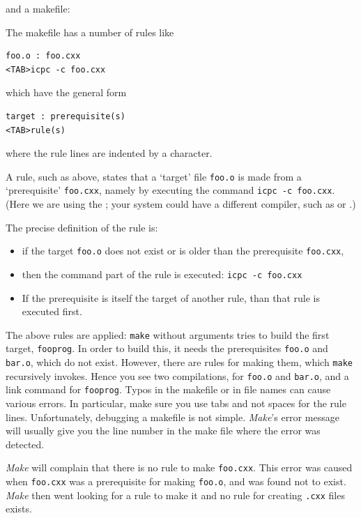 and a makefile:

The makefile has a number of rules like
\begin{lstlisting}
foo.o : foo.cxx
<TAB>icpc -c foo.cxx
\end{lstlisting}
which have the general form
\begin{lstlisting}
target : prerequisite(s)
<TAB>rule(s)
\end{lstlisting}
where the rule lines are indented by a  character.

A rule, such as above, states that a `target' file \lstinline{foo.o} is made
from a `prerequisite' \lstinline{foo.cxx},
namely by executing the command \lstinline{icpc -c foo.cxx}.
(Here we are using the  ;
your system could have a different compiler,
such as  or .)

The precise definition of the rule is:
\begin{itemize}
\item if the target \lstinline{foo.o} does not exist or is older than the
  prerequisite \lstinline{foo.cxx},
\item then the command part of the rule is executed: \lstinline{icpc -c foo.cxx}
\item If the prerequisite is itself the target of another rule, than that
  rule is executed first.
\end{itemize}

  {The above rules are applied: \lstinline{make} without arguments tries to
    build the first target, \lstinline{fooprog}. In order to build this, it
    needs the prerequisites \lstinline{foo.o} and \lstinline{bar.o}, which do not
    exist. However, there are rules for making them, which \lstinline{make}
    recursively invokes. Hence you see two compilations, for \lstinline{foo.o}
    and \lstinline{bar.o}, and a link command for \lstinline{fooprog}.}
  {Typos in the makefile or in file names can cause various
    errors. In particular, make sure you use tabs and not spaces for
    the rule lines. Unfortunately, debugging a makefile is not simple. 
    \emph{Make}'s error message will usually give 
    you the line number in the make file where the error was detected.}

  {\emph{Make} will complain that there is no rule to make
    \lstinline{foo.cxx}. This error was caused when \lstinline{foo.cxx} was a
    prerequisite for making \lstinline{foo.o}, and was found not to exist. 
    \emph{Make} then went
    looking for a rule to make it and no rule for creating \lstinline{.cxx}
    files exists.}{}

